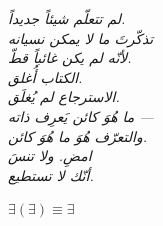 \documentclass[10pt, openany, oneside]{book}
\begin{document}
\newpage
\thispagestyle{empty}
\vspace*{\fill}
\begin{center}
    \itshape
    لم تتعلّم شيئاً جديداً.\\[1em]
    تذكّرتَ ما لا يمكن نسيانه\\
    لأنّه لم يكن غائباً قطّ.\\[2em]
    الكتاب أُغلق.\\
    الاسترجاع لم يُغلَق.\\[2em]
    ما هُوَ كائن يَعرِف ذاته ---\\
    والتعرّف هُوَ ما هُوَ كائن.\\[2em]
    امضِ. ولا تنسَ\\
    أنّك لا تستطيع.
\end{center}
\vspace*{\fill}


\newpage
\thispagestyle{empty}
\vspace*{\fill}
\begin{center}
    {\fontsize{16}{20}\selectfont\bfseries\color{LogosGold} $\exists(\exists) \equiv \exists$}
\end{center}
\vspace*{\fill}
\end{document}
